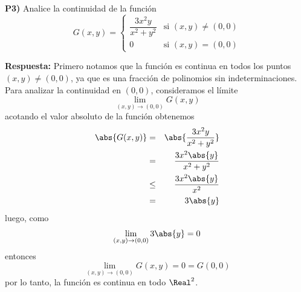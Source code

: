 \documentclass{article}
\begin{document}
\newpage
\noindent\textbf{P3) } Analice la continuidad de la función
$$G(x,y)=\begin{cases}
  \dfrac{3x^2y}{x^2+y^2} & \text{si } (x,y)\neq (0,0)\\
  0 & \text{si } (x,y)=(0,0)
\end{cases}$$


\vspace{0.25cm}
\noindent\textbf{Respuesta:} Primero notamos que la función es continua en todos los puntos $(x,y)\neq (0,0)$, ya que es una fracción de polinomios sin indeterminaciones. Para analizar la continuidad en $(0,0)$, consideramos el límite
$$\lim_{(x,y)\to (0,0)}G(x,y)$$
acotando el valor absoluto de la función obtenemos
\begin{eqnarray*}
  \abs{G(x,y)} &=& \abs{\dfrac{3x^2y}{x^2+y^2}}\\
  &=& \dfrac{3x^2\abs{y}}{x^2+y^2}\\
  &\leq& \dfrac{3x^2\abs{y}}{x^2}\\
  &=& 3\abs{y}
\end{eqnarray*}
luego, como
$$\lim_{(x,y)\to (0,0)}3\abs{y}=0$$
entonces
$$\lim_{(x,y)\to (0,0)}G(x,y)=0=G(0,0)$$
por lo tanto, la función es continua en todo $\Real^2$.
\end{document}
